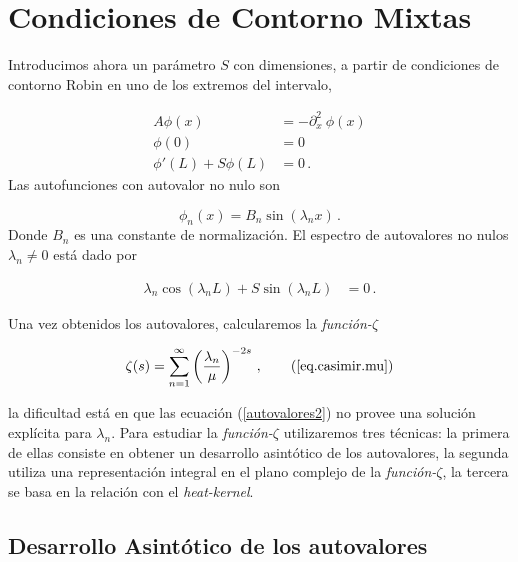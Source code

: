\section{Condiciones de Contorno Mixtas}


Introducimos ahora un parámetro $S$ con dimensiones, a partir de condiciones de contorno Robin en uno de los extremos del intervalo,

\begin{equation}
\begin{aligned}
    A \phi (x) &= - \partial ^2 _x \ \phi (x)  \\[5pt]
    \phi (0) &= 0 \\[5pt]
    \phi ' (L) + S \phi (L) &= 0 \, .
\end{aligned}
\end{equation}
Las autofunciones con autovalor no nulo son

\begin{equation}
\phi _n (x) = 
B _n \sin ( \lambda _n x ) \, .
\end{equation}
Donde $B_n$ es una constante de normalización. El espectro de autovalores no nulos $\lambda _n \neq 0 $ está dado por

\begin{align}
    \lambda _n   \cos( \lambda _n L) +  S \sin( \lambda _n L) &= 0
    \, . \label{autovalores2} 
\end{align}

Una vez obtenidos los autovalores, calcularemos la {\it función-$\zeta$}

\begin{equation}
    \zeta (s) =  \sum_{n = 1} ^{ \infty } \left( \frac{\lambda _n}{\mu } \right) ^ {-2 s} \, ,
    \tag{\ref{eq.casimir.mu}}
\end{equation}

la dificultad está en que las ecuación (\ref{autovalores2}) no provee una solución explícita para $\lambda _n$. Para estudiar la  {\it función-$\zeta$} utilizaremos tres técnicas: la primera de ellas consiste en obtener un desarrollo asintótico de los autovalores, la segunda utiliza una representación integral en el plano complejo de la {\it función-$\zeta$}, la tercera se basa en la relación con el {\it heat-kernel}. 

\subsection{Desarrollo Asintótico de los autovalores}{\label{seq.asin}}

